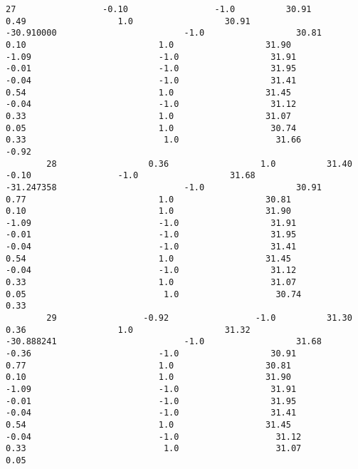 \documentclass[11pt]{article}
\begin{document}
\begin{Verbatim}[commandchars=\\\{\}]
        27                 -0.10                 -1.0          30.91                  0.49                  1.0                  30.91                  -30.910000                         -1.0                  30.81                          0.10                          1.0                  31.90                         -1.09                         -1.0                  31.91                         -0.01                         -1.0                  31.95                         -0.04                         -1.0                  31.41                          0.54                          1.0                  31.45                         -0.04                         -1.0                  31.12                          0.33                          1.0                  31.07                          0.05                          1.0                   30.74                          0.33                           1.0                   31.66                          -0.92   
        28                  0.36                  1.0          31.40                 -0.10                 -1.0                  31.68                  -31.247358                         -1.0                  30.91                          0.77                          1.0                  30.81                          0.10                          1.0                  31.90                         -1.09                         -1.0                  31.91                         -0.01                         -1.0                  31.95                         -0.04                         -1.0                  31.41                          0.54                          1.0                  31.45                         -0.04                         -1.0                  31.12                          0.33                          1.0                   31.07                          0.05                           1.0                   30.74                           0.33   
        29                 -0.92                 -1.0          31.30                  0.36                  1.0                  31.32                  -30.888241                         -1.0                  31.68                         -0.36                         -1.0                  30.91                          0.77                          1.0                  30.81                          0.10                          1.0                  31.90                         -1.09                         -1.0                  31.91                         -0.01                         -1.0                  31.95                         -0.04                         -1.0                  31.41                          0.54                          1.0                  31.45                         -0.04                         -1.0                   31.12                          0.33                           1.0                   31.07                           0.05   

\end{Verbatim}
\end{document}
